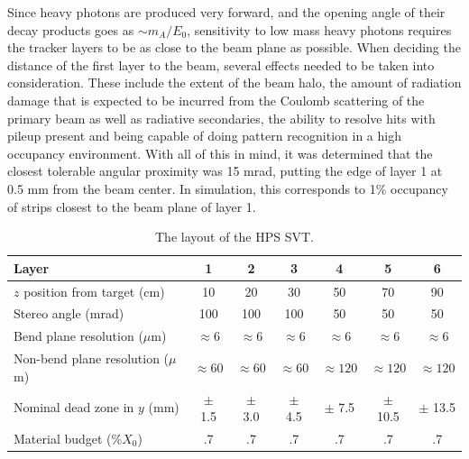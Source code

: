 Since heavy photons are produced very forward, and the opening angle of their 
decay products goes as $\sim m_{A}/E_{0}$, sensitivity to low mass heavy photons
requires
the tracker layers to be as close to the beam plane as possible.  When deciding
the distance of the first layer to the beam, several effects needed to be taken
into consideration. These include the extent of the beam halo, the amount of 
radiation damage that is expected to be incurred from the Coulomb scattering
of the primary beam as well as radiative secondaries, the ability to resolve 
hits with pileup present and being capable of doing pattern recognition in a high 
occupancy environment.  With all of this in mind, it was determined that the 
closest tolerable angular proximity was 15 mrad, putting the edge of layer 1 
at 0.5 mm from the beam center. In simulation, this corresponds to 1\% occupancy
of strips closest to the beam plane of layer 1.


\begin{table}
    \centering
    \begin{tabular}{lcccccc}  
        \toprule
        \textbf{Layer} & \textbf{1} & \textbf{2} & \textbf{3} & \textbf{4} & \textbf{5} & \textbf{6} \\
        \midrule
        \midrule
        $z$ position from target (cm)    & 10 & 20 & 30 & 50 & 70 & 90 \\
        Stereo angle (mrad) & 100 & 100 & 100 & 50 & 50 & 50 \\
        Bend plane resolution ($\mu$m) & $\approx$6 & $\approx$6 & $\approx$6 & $\approx$6 & $\approx$6 & $\approx$6 \\
        Non-bend plane resolution ($\mu$m) & $\approx60$ & $\approx60$ & $\approx60$ & $\approx120$ & $\approx120$ & $\approx120$ \\
        Nominal dead zone in $y$ (mm) & $\pm$ 1.5 & $\pm$ 3.0 & $\pm$ 4.5 & $\pm$ 7.5 & $\pm$ 10.5 & $\pm$ 13.5 \\ 
        Material budget (\%$X_0$) & .7 & .7 & .7 & .7 & .7 & .7 \\
        \bottomrule
    \end{tabular}
    \caption{The layout of the HPS SVT.}
    \label{tab:svt_layout}
\end{table}

